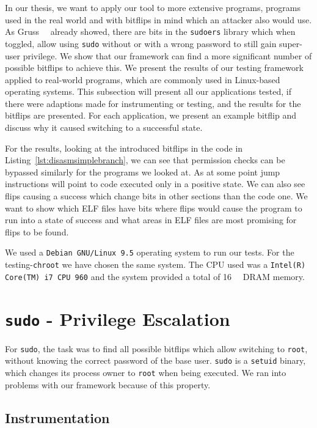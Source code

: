 In our thesis, we want to apply our tool to more extensive programs, programs
used in the real world and with bitflips in mind which an attacker also would
use. As Gruss~\etal~\cite{flipinthewall} already showed, there are bits in the
\texttt{sudoers} library which when toggled, allow using \texttt{sudo} without
or with a wrong password to still gain super-user privilege. We show that our
framework can find a more significant number of possible bitflips to achieve
this. We present the results of our testing framework applied to real-world
programs, which are commonly used in Linux-based operating systems. This
subsection will present all our applications tested, if there were adaptions
made for instrumenting or testing, and the results for the bitflips are
presented. For each application, we present an example bitflip and discuss why
it caused switching to a successful state.

For the results, looking at the introduced bitflips in the code in
Listing~\ref{lst:disasmsimplebranch}, we can see that permission checks can be
bypassed similarly for the programs we looked at. As at some point jump
instructions will point to code executed only in a positive state. We can also
see flips causing a success which change bits in other sections than the code
one. We want to show which ELF files have bits where flips would cause the
program to run into a state of success and what areas in ELF files are most
promising for flips to be found.

We used a \texttt{Debian GNU/Linux 9.5} operating system to run our tests. For
the testing-\texttt{chroot} we have chosen the same system. The CPU used was a
\texttt{Intel(R) Core(TM) i7 CPU 960} and the system provided a total of
\SI{16}{\giga\byte} DRAM memory.

\section{\texttt{sudo} - Privilege Escalation}

For \texttt{sudo}, the task was to find all possible bitflips which allow
switching to \texttt{root}, without knowing the correct password of the base
user. \texttt{sudo} is a \texttt{setuid} binary, which changes its process
owner to \texttt{root} when being executed. We ran into problems with our
framework because of this property.

\subsection{Instrumentation}

